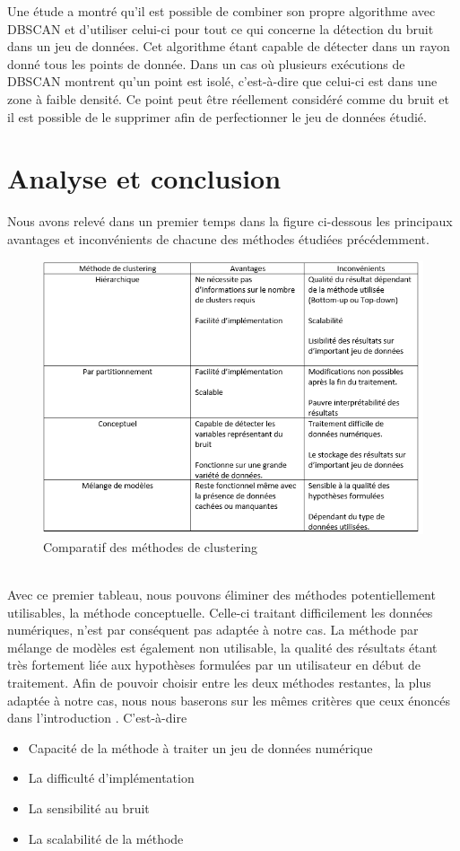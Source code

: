 \documentclass[memoire.tex]{subfiles}
\begin{document}
Une étude a montré qu’il est possible de combiner son propre algorithme avec DBSCAN et d’utiliser celui-ci pour tout ce qui concerne la détection du bruit dans un jeu de données. Cet algorithme étant capable de détecter dans un rayon donné tous les points de donnée. Dans un cas où plusieurs exécutions de DBSCAN montrent qu’un point est isolé, c’est-à-dire que celui-ci est dans une zone à faible densité. Ce point peut être réellement considéré comme du bruit et il est possible de le supprimer afin de perfectionner le jeu de données étudié.\cite{ref17}

\section{Analyse et conclusion}

Nous avons relevé dans un premier temps dans la figure ci-dessous les principaux avantages et inconvénients de chacune des méthodes étudiées précédemment.
	\begin{figure}[h!]
		\centerline{\includegraphics[scale=0.7]{img/comparatif_methodes.png}}
		\caption{Comparatif des méthodes de clustering}
	\end{figure}\\
Avec ce premier tableau, nous pouvons éliminer des méthodes potentiellement utilisables, la méthode conceptuelle. Celle-ci traitant difficilement les données numériques, n'est par conséquent pas adaptée à notre cas. La méthode par mélange de modèles est également non utilisable, la qualité des résultats étant très fortement liée aux hypothèses formulées par un utilisateur en début de traitement.
Afin de pouvoir choisir entre les deux méthodes restantes, la plus adaptée à notre cas, nous nous baserons sur les mêmes critères que ceux énoncés dans l'introduction . C'est-à-dire \begin{itemize}
\item Capacité de la méthode à traiter un jeu de données numérique
\item La difficulté d'implémentation
\item La sensibilité au bruit
\item La scalabilité de la méthode
\end{itemize}
\end{document}

